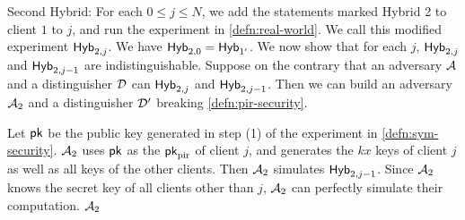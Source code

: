 
Second Hybrid: For each $0 \leq j \leq N$, we add the statements marked Hybrid 2 to client $1$ to $j$, and run the experiment in \cref{defn:real-world}. We call this modified experiment $\mathsf{Hyb}_{2, j}$.
We have $\mathsf{Hyb}_{2, 0} = \mathsf{Hyb}_{1'}$. We now show that for each $j$, $\mathsf{Hyb}_{2, j}$ and $\mathsf{Hyb}_{2 ,j - 1}$ are indistinguishable. Suppose on the contrary that an adversary $\mathcal{A}$ and a distinguisher $\mathcal{D}$ can $\mathsf{Hyb}_{2, j}$ and $\mathsf{Hyb}_{2 ,j - 1}$. Then we can build an adversary $\mathcal{A}_2$ and a distinguisher $\mathcal{D}'$ breaking \cref{defn:pir-security}. 

Let $\mathsf{pk}$ be the public key generated in step (1) of the experiment in \cref{defn:sym-security}. $\mathcal{A}_2$ uses $\mathsf{pk}$ as the $\mathsf{pk}_{\text{pir}}$ of client $j$, and generates the $kx$ keys of client $j$ as well as all keys of the other clients. Then $\mathcal{A}_2$ simulates $\mathsf{Hyb}_{2, j - 1}$. Since $\mathcal{A}_2$ knows the secret key of all clients other than $j$, $\mathcal{A}_2$ can perfectly simulate their computation. $\mathcal{A}_2$

